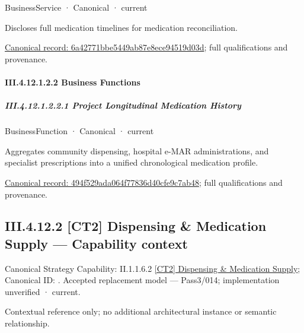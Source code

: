 \label{element:6a42771bbe5449ab87e8ece94519d03d}
{\small BusinessService · Canonical · current}\par

Discloses full medication timelines for medication reconciliation.


{\footnotesize \href{../../../../../../../../continuum/business/business-service/6a42771bbe5449ab87e8ece94519d03d.md}{Canonical record: 6a42771bbe5449ab87e8ece94519d03d}; full qualifications and provenance.}\par
\paragraph*{III.4.12.1.2.2 Business Functions}
\label{navigation:III.4.12.1.2.2}

\subparagraph*{III.4.12.1.2.2.1 Project Longitudinal Medication History}
\label{navigation:III.4.12.1.2.2.1}

\label{element:494f529ada064f77836d40cfe9c7ab48}
{\small BusinessFunction · Canonical · current}\par

Aggregates community dispensing, hospital e-MAR administrations, and specialist prescriptions into a unified chronological medication profile.


{\footnotesize \href{../../../../../../../../continuum/business/business-function/494f529ada064f77836d40cfe9c7ab48.md}{Canonical record: 494f529ada064f77836d40cfe9c7ab48}; full qualifications and provenance.}\par
\subsection*{III.4.12.2 [CT2] Dispensing \& Medication Supply — Capability context}
\label{navigation:III.4.12.2}

{\small Canonical Strategy Capability: II.1.1.6.2 \hyperref[element:a85bdb32f6294d018e7d324cffd624d6]{[CT2] Dispensing \& Medication Supply}; Canonical ID: \texttt{}. Accepted replacement model — Pass3/014; implementation unverified · current.}\par
Contextual reference only; no additional architectural instance or semantic relationship.\par
